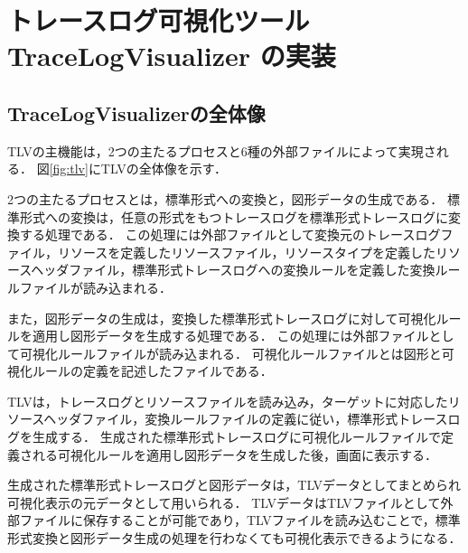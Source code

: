 \chapter{トレースログ可視化ツール TraceLogVisualizer の実装}

\section{TraceLogVisualizerの全体像}

TLVの主機能は，2つの主たるプロセスと6種の外部ファイルによって実現される．
図\ref{fig:tlv}にTLVの全体像を示す．

2つの主たるプロセスとは，標準形式への変換と，図形データの生成である．
標準形式への変換は，任意の形式をもつトレースログを標準形式トレースログに変換する処理である．
この処理には外部ファイルとして変換元のトレースログファイル，リソースを定義したリソースファイル，リソースタイプを定義したリソースヘッダファイル，標準形式トレースログへの変換ルールを定義した変換ルールファイルが読み込まれる．

また，図形データの生成は，変換した標準形式トレースログに対して可視化ルールを適用し図形データを生成する処理である．
この処理には外部ファイルとして可視化ルールファイルが読み込まれる．
可視化ルールファイルとは図形と可視化ルールの定義を記述したファイルである．

TLVは，トレースログとリソースファイルを読み込み，ターゲットに対応したリソースヘッダファイル，変換ルールファイルの定義に従い，標準形式トレースログを生成する．
生成された標準形式トレースログに可視化ルールファイルで定義される可視化ルールを適用し図形データを生成した後，画面に表示する．


生成された標準形式トレースログと図形データは，TLVデータとしてまとめられ可視化表示の元データとして用いられる．
TLVデータはTLVファイルとして外部ファイルに保存することが可能であり，TLVファイルを読み込むことで，標準形式変換と図形データ生成の処理を行わなくても可視化表示できるようになる．

